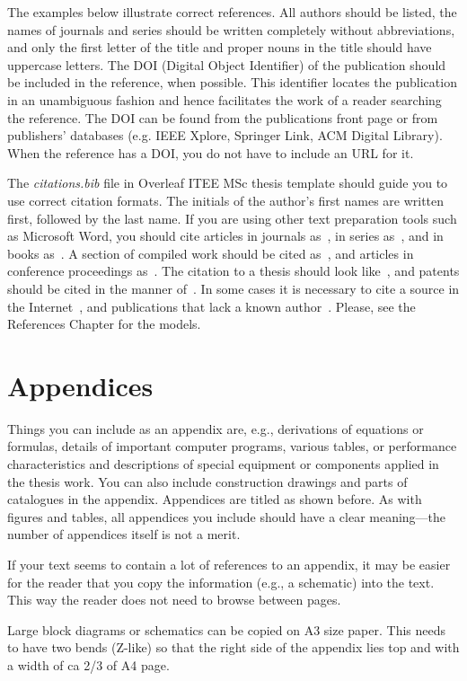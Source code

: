 The examples below illustrate correct references. All authors should
be listed, the names of journals and series should be written
completely without abbreviations, and only the first letter of the
title and proper nouns in the title should have uppercase letters. The
DOI (Digital Object Identifier) of the publication should be included
in the reference, when possible. This identifier locates the
publication in an unambiguous fashion and hence facilitates the work
of a reader searching the reference. The DOI can be found from the
publications front page or from publishers’ databases (e.g. IEEE
Xplore, Springer Link, ACM Digital Library). When the reference has a
DOI, you do not have to include an URL for it.

The \textit{citations.bib} file in Overleaf ITEE MSc thesis template should guide you to use correct citation formats. The initials of the author's first names are written first, followed by the last name. If you are using other text preparation tools such as Microsoft Word, you should cite articles in journals  as~\cite{ojala:2002}, in series as~\cite{riekki:1998}, and in books as~\cite[p. 55]{pietikainen:2011}. A section of compiled work should be cited as~\cite{cvejic:2005}, and articles in conference proceedings as~\cite{heikkila:1997}. The citation to a thesis should look like~\cite{heikkinen:2011}, and patents should be cited in the manner of~\cite{toivonen:2004}. In some cases it is necessary to cite a source in the Internet~\cite{korpela}, and publications that lack a known author~\cite{asuntoliitto_asumistaso_1969}. Please, see the References Chapter for the models.

\section{Appendices}
\label{sec:appendices}
Things you can include as an appendix are, e.g., derivations of equations or formulas, details of important computer programs, various tables, or performance characteristics and descriptions of special equipment or components applied in the thesis work. You can also include construction drawings and parts of catalogues in the appendix. Appendices are titled as shown before. As with figures and tables, all appendices you include should have a clear meaning---the number of appendices itself is not a merit.

If your text seems to contain a lot of references to an appendix, it may be easier for the reader that you copy the information (e.g., a schematic) into the text. This way the reader does not need to browse between pages.

Large block diagrams or schematics can be copied on A3 size paper. This needs to have two bends (Z-like) so that the right side of the appendix lies top and with a width of ca 2/3 of A4 page.
